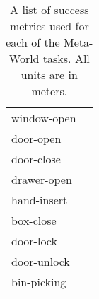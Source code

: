 \begin{table}[h]
\begin{tabular}{lc}
window-open & \\
door-open & \\
door-close & \\
drawer-open & \\
hand-insert & \\
box-close & \\
door-lock & \\
door-unlock & \\
bin-picking & \\
\bottomrule
\end{tabular}
\vspace{0.2cm}
    \caption{A list of success metrics used for each of the Meta-World tasks. All units are in meters.}
    \label{tbl:task_metrics}
\end{table}


